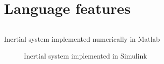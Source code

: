 \documentclass[\rootfolder/main.tex]{subfiles}
\begin{document}
\section{Language features}

\begin{listing}[ht]
    \inputminted[fontsize=\footnotesize, firstline=1, lastline=8]{matlab}{\rootfolder/Models/Matlab/InertialMatlab.m}
    \caption{Inertial system implemented numerically in Matlab}
\end{listing}

\begin{figure}[ht]
    \centering
    \footnotesize
    \resizebox{0.8\textwidth}{!}{}
    \caption{Inertial system implemented in Simulink}
    \label{fig:inertial-simulink}
\end{figure}
\end{document}
